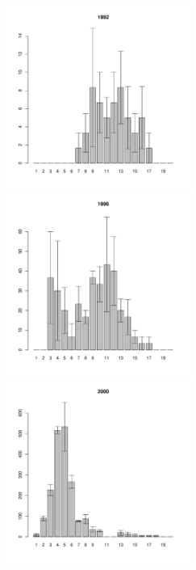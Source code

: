\documentclass[12pt, a4paper]{article}
\begin{document}

\begin{figure}[h]

\begin{multicols}{3}
\hfill
\includegraphics[width=60mm]{../White_Sea/Estuatiy_Luvenga/sizestr_1992_.pdf}
\hfill
\includegraphics[width=60mm]{../White_Sea/Estuatiy_Luvenga/sizestr_1996_.pdf}
\hfill
\includegraphics[width=60mm]{../White_Sea/Estuatiy_Luvenga/sizestr_2000_.pdf}
\end{multicols}




\end{figure}
\end{document}
